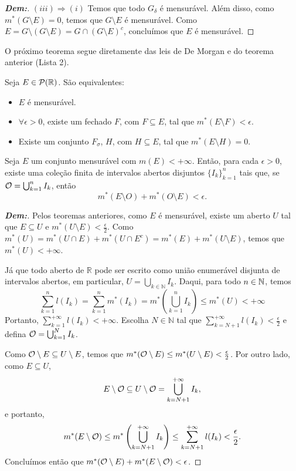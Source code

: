 \begin{proof}[\textbf{Dem:}]
\noindent
$(iii) \Rightarrow (i)$ Temos que todo $G_\delta$ é mensurável. Além disso, como $m^*(G \setminus E) = 0$, temos que $G \setminus E$ é mensurável. Como $E = G \setminus (G \setminus E) = G \cap (G \setminus E)^c$, concluímos que $E$ é mensurável.
\end{proof}

\noindent
O próximo teorema segue diretamente das leis de De Morgan e do teorema anterior (Lista 2).

\begin{theorem*}{}
Seja $E \in \mathcal{P}(\mathbb{R})$. São equivalentes:
\begin{itemize}
    \item[i)] $E$ é mensurável.
    \item[ii)] $\forall \epsilon > 0$, existe um fechado $F$, com $F \subseteq E$, tal que $m^*(E \setminus F) < \epsilon$.
    \item[iii)] Existe um conjunto $F_\sigma$, $H$, com $H \subseteq E$, tal que $m^*(E \setminus H) = 0$.
\end{itemize}
\end{theorem*}

\begin{theorem*}{}
Seja $E$ um conjunto mensurável com $m(E) < +\infty$. Então, para cada $\epsilon > 0$, existe uma coleção finita de intervalos abertos disjuntos $\{I_k\}_{k=1}^n$ tais que, se
  $\mathcal O = \bigcup_{k=1}^n I_k$, então 
  $$m^*(E \setminus O) + m^*(O \setminus E) < \epsilon.$$
\end{theorem*}

\begin{proof}[\textbf{Dem:}]
Pelos teoremas anteriores, como $E$ é mensurável, existe um aberto $U$ tal que $E \subseteq U$ e $m^*(U \setminus E) < \frac{\epsilon}{2}$.
Como $m^*(U) = m^*(U \cap E) + m^*(U \cap E^c) = m^*(E) + m^*(U \setminus E)$, temos que $m^*(U) < +\infty$.

  Já que todo aberto de $\mathbb{R}$ pode ser escrito como união enumerável disjunta
  de intervalos abertos, em particular, $U = \bigcup_{k \in \mathbb{N}} I_k$.
  Daqui, para todo $n \in \mathbb N$, temos 
  $$\sum_{k=1}^n l(I_k) = \sum_{k=1}^n m^*(I_k) =
  m^*\left(\bigcup_{k=1}^n I_k\right) \le m^*(U) < +\infty$$
Portanto, $\sum_{k=1}^{+\infty} l(I_k) < +\infty$. Escolha $N \in \mathbb{N}$ tal que 
  $\sum_{k=N+1}^{+\infty} l(I_k) < \frac{\epsilon}{2}$ e defina $\mathcal O = \bigcup_{k=1}^N I_k$.

Como $\mathcal O \setminus E \subseteq U \setminus E$,
temos que $m^*(\mathcal O \setminus E) \le m^*(U \setminus E) < \frac{\epsilon}{2}$. Por outro lado, como $E \subseteq U$, 
$$ E \setminus \mathcal O \subseteq U \setminus \mathcal O = \bigcup_{k=N+1}^{+\infty} I_k, $$
e portanto, 
$$ m^*(E \setminus \mathcal O) \le m^*\left(\bigcup_{k=N+1}^{+\infty} I_k\right)
  \le \sum_{k=N+1}^{+\infty} l(I_k) < \frac{\epsilon}{2}. $$
Concluímos então que $m^*(\mathcal O \setminus E) + m^*(E \setminus \mathcal O) < \epsilon$.
\end{proof}


